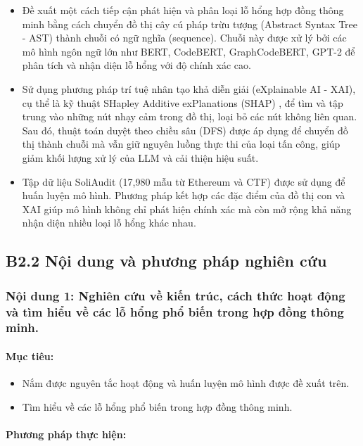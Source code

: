 \documentclass[letterpaper]{article}
\begin{document}
\begin{itemize}
    \item Đề xuất một cách tiếp cận phát hiện và phân loại lỗ hổng hợp đồng thông minh bằng cách chuyển đồ thị cây cú pháp trừu tượng (Abstract Syntax Tree - AST) thành chuỗi có ngữ nghĩa (sequence). Chuỗi này được xử lý bởi các mô hình ngôn ngữ lớn như BERT, CodeBERT, GraphCodeBERT, GPT-2 để phân tích và nhận diện lỗ hổng với độ chính xác cao.

    \item Sử dụng phương pháp trí tuệ nhân tạo khả diễn giải (eXplainable AI - XAI), cụ thể là kỹ thuật SHapley Additive exPlanations (SHAP) \cite{lundberg2017unified_shap}, để tìm và tập trung vào những nút nhạy cảm trong đồ thị, loại bỏ các nút không liên quan. Sau đó, thuật toán duyệt theo chiều sâu (DFS) được áp dụng để chuyển đồ thị thành chuỗi mà vẫn giữ nguyên luồng thực thi của loại tấn công, giúp giảm khối lượng xử lý của LLM và cải thiện hiệu suất.

    \item Tập dữ liệu SoliAudit (17,980 mẫu từ Ethereum và CTF) \cite{liao2019soliaudit} được sử dụng để huấn luyện mô hình. Phương pháp kết hợp các đặc điểm của đồ thị con và XAI giúp mô hình không chỉ phát hiện chính xác mà còn mở rộng khả năng nhận diện nhiều loại lỗ hổng khác nhau.
\end{itemize}


\subsection{B2.2 Nội dung và phương pháp nghiên cứu}
\subsubsection{Nội dung 1: Nghiên cứu về kiến trúc, cách thức hoạt động và tìm hiểu về các lỗ hổng phổ biến trong hợp đồng thông minh.}

\paragraph{Mục tiêu:}
\begin{itemize}
    \item Nắm được nguyên tắc hoạt động và huấn luyện mô hình được đề xuất trên.
    \item Tìm hiểu về các lỗ hổng phổ biến trong hợp đồng thông minh.
\end{itemize}

\paragraph{Phương pháp thực hiện:}
\end{document}
